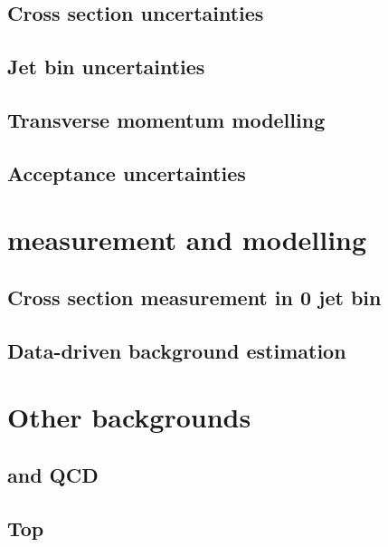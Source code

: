 \documentclass[hyper,linkcolor=blue]{mythesis}
\begin{document}
\begin{mainmatter}
    \section{Cross section uncertainties}
      \label{sec:ggf_xs}
      
    \section{Jet bin uncertainties}
      \label{sec:ggf_jetbin}
      
    \section{Transverse momentum modelling}
      \label{sec:ggf_pt}
      
    \section{Acceptance uncertainties}
      \label{sec:ggf_acc}
      

  \chapter{\WW measurement and modelling}
    \label{chap:ww}
    
    \section{Cross section measurement in 0 jet bin}
      \label{sec:ww_meas}
      
    \section{Data-driven background estimation}
      \label{sec:ww_bkg}
      

  \chapter{Other backgrounds}
    \label{chap:backgrounds}
    
    \section{\Wjets and QCD}
      \label{sec:wjets}
      
    \section{Top}
      \label{sec:top}
      

\end{mainmatter}
\end{document}
